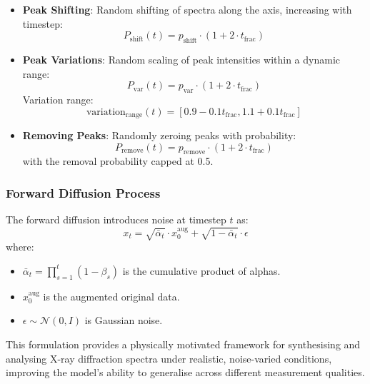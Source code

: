\begin{itemize}
    \item \textbf{Peak Shifting}: Random shifting of spectra along the axis, increasing with timestep:
    \begin{equation}
    P_{\text{shift}}(t) = p_{\text{shift}} \cdot (1 + 2 \cdot t_{\text{frac}})
    \end{equation}

    \item \textbf{Peak Variations}: Random scaling of peak intensities within a dynamic range:
    \begin{equation}
    P_{\text{var}}(t) = p_{\text{var}} \cdot (1 + 2 \cdot t_{\text{frac}})
    \end{equation}
    Variation range:
    \begin{equation}
    \text{variation}_{\text{range}}(t) = \left[0.9 - 0.1 t_{\text{frac}}, 1.1 + 0.1 t_{\text{frac}}\right]
    \end{equation}

    \item \textbf{Removing Peaks}: Randomly zeroing peaks with probability:
    \begin{equation}
    P_{\text{remove}}(t) = p_{\text{remove}} \cdot (1 + 2 \cdot t_{\text{frac}})
    \end{equation}
    with the removal probability capped at 0.5.
\end{itemize}

\subsubsection{Forward Diffusion Process}
The forward diffusion introduces noise at timestep \( t \) as:
\begin{equation}
x_t = \sqrt{\bar{\alpha}_t} \cdot x_{0}^{\text{aug}} + \sqrt{1 - \bar{\alpha}_t} \cdot \epsilon
\end{equation}
where:
\begin{itemize}
    \item \( \bar{\alpha}_t = \prod_{s=1}^{t}(1 - \beta_s) \) is the cumulative product of alphas.
    \item \( x_{0}^{\text{aug}} \) is the augmented original data.
    \item \( \epsilon \sim \mathcal{N}(0, I) \) is Gaussian noise.
\end{itemize}

This formulation provides a physically motivated framework for synthesising and analysing X-ray diffraction spectra under realistic, noise-varied conditions, improving the model's ability to generalise across different measurement qualities.



